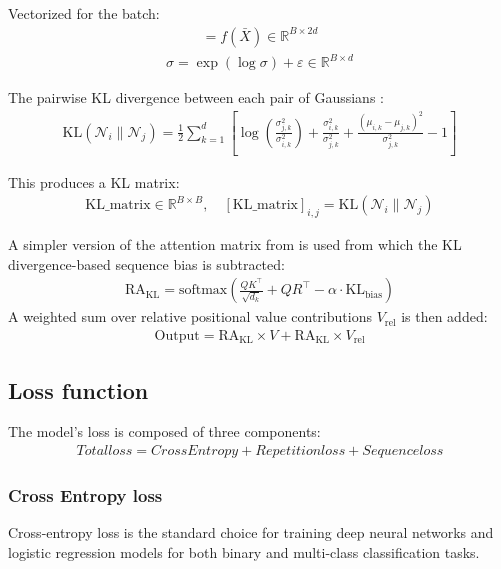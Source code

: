 \documentclass[twoside,11pt]{article}
\begin{document}
Vectorized for the batch:
\begin{align}
[\mu, \log \sigma] = f(\bar{X}) \in \mathbb{R}^{B \times 2d}
\end{align}
\begin{align}
\sigma = \exp(\log \sigma) + \varepsilon \in \mathbb{R}^{B \times d}
\end{align}

The pairwise KL divergence between each pair of Gaussians \cite{kldiv}:
\begin{align}
\label{eq:kldiv}
\text{KL}(\mathcal{N}_i \parallel \mathcal{N}_j) =
\frac{1}{2} \sum_{k=1}^{d} \left[
\log\left( \frac{\sigma_{j,k}^2}{\sigma_{i,k}^2} \right) +
\frac{\sigma_{i,k}^2}{\sigma_{j,k}^2} +
\frac{(\mu_{i,k} - \mu_{j,k})^2}{\sigma_{j,k}^2} - 1
\right]
\end{align}

This produces a KL matrix:
\begin{align}
\text{KL\_matrix} \in \mathbb{R}^{B \times B}, \quad
[\text{KL\_matrix}]_{i,j} = \text{KL}(\mathcal{N}_i \parallel \mathcal{N}_j)
\end{align}

A simpler version of the attention matrix from \cite{XL} is used from which the KL divergence-based sequence bias is subtracted:
\begin{align}
\text{RA}_{\text{KL}} = \text{softmax} \left( \frac{Q K^\top}{\sqrt{d_k}} + Q R^\top - \alpha \cdot \text{KL}_{\text{bias}} \right)
\end{align}
A weighted sum over relative positional value contributions $V_{\text{rel}}$ is then added:
\begin{align}
\text{Output} = \text{RA}_{\text{KL}} \times V + \text{RA}_{\text{KL}} \times V_{\text{rel}}
\end{align}
\subsection{Loss function}
The model’s loss is composed of three components:
\begin{align}
Totalloss=CrossEntropy + Repetition loss + Sequence loss
\end{align}
\subsubsection{Cross Entropy loss}
Cross-entropy loss is the standard choice for training deep neural networks and logistic regression models for both binary and multi-class classification tasks. \cite{mlglossary}
\end{document}
